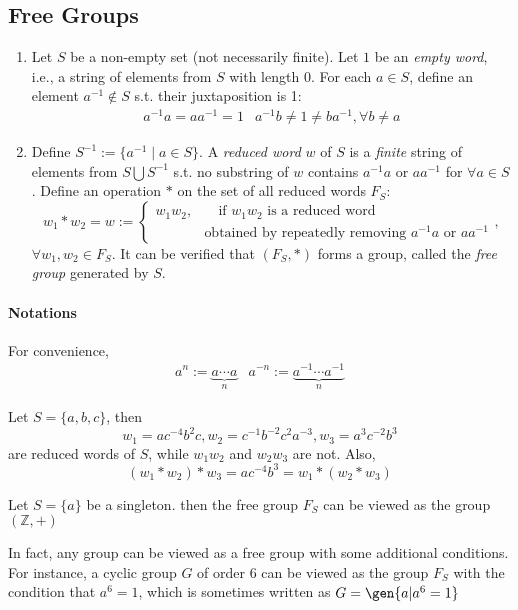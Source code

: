 \subsection{Free Groups}
\begin{definition}
\begin{enumerate}
\item
Let $S$ be a non-empty set (not necessarily finite). Let $1$ be an \emph{empty word}, i.e., a string of elements from $S$ with length $0$. For each $a\in S$, define an element $a^{-1}\notin S$ s.t. their juxtaposition is 1:
\[
\begin{array}{ll}
a^{-1}a=aa^{-1}=1
&
a^{-1}b\ne 1\ne ba^{-1},\forall b\ne a
\end{array}
\]
\item
Define $S^{-1}:=\{a^{-1}\mid a\in S\}$. A \emph{reduced word} $w$ of $S$ is a \emph{finite} string of elements from $S\bigcup S^{-1}$ s.t. no substring of $w$ contains $a^{-1}a$ or $aa^{-1}$ for $\forall a\in S$. Define an operation $*$ on the set of all reduced words $F_S$:
\[
w_1*w_2=w:=\left\{
\begin{aligned}
w_1w_2,&\quad\mbox{if $w_1w_2$ is a reduced word}\\
&\mbox{obtained by repeatedly removing $a^{-1}a$ or $aa^{-1}$}
\end{aligned}
\right.,\]
$\forall w_1,w_2\in F_S.$ It can be verified that $(F_S,*)$ forms a group, called the \emph{free group} generated by $S$.
\end{enumerate}
\end{definition}
\paragraph{Notations}
For convenience,
\[
\begin{array}{ll}
a^n:=\underbrace{a\cdots a}_{n}
&
a^{-n}:=\underbrace{a^{-1}\cdots a^{-1}}_{n}
\end{array}
\]
\begin{example}
Let $S=\{a,b,c\}$, then 
\[
w_1=ac^{-4}b^2c,w_2=c^{-1}b^{-2}c^2a^{-3},
w_3=a^3c^{-2}b^3
\]
are reduced words of $S$, while $w_1w_2$ and $w_2w_3$ are not. Also,
\[
(w_1*w_2)*w_3=ac^{-4}b^3=w_1*(w_2*w_3)
\]
\end{example}
\begin{example}
Let $S=\{a\}$ be a singleton. then the free group $F_S$ can be viewed as the group $(\mathbb{Z},+)$
\end{example}
In fact, any group can be viewed as a free group with some additional conditions. For instance, a cyclic group $G$ of order 6 can be viewed as the group $F_S$ with the condition that $a^6 = 1$, which is sometimes written as $G=\gen{a|a^6=1}$








